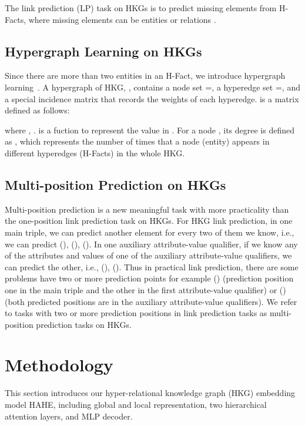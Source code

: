 \documentclass[11pt]{article}
\begin{document}
The link prediction (LP) task on HKGs is to predict missing elements from H-Facts, where missing elements can be entities   or relations . 


\subsection{Hypergraph Learning on HKGs} 
Since there are more than two entities in an H-Fact, we introduce hypergraph learning~\citep{HGNN}. A hypergraph of HKG, , contains a node set =, a hyperedge set =, and a special incidence matrix  that records the weights of each hyperedge.  is a  matrix defined as follows:

where , .  is a fuction to represent the value in . For a node , its degree is defined as , which represents the number of times that a node (entity) appears in different hyperedges (H-Facts) in the whole HKG.









\subsection{Multi-position Prediction on HKGs} 
Multi-position prediction is a new meaningful task with more practicality than the one-position link prediction task on HKGs. For HKG link prediction, in one main triple, we can predict another element for every two of them we know, i.e., we can predict (), (), (). In one auxiliary attribute-value qualifier, if we know any of the attributes and values of one of the auxiliary attribute-value qualifiers, we can predict the other, i.e., (), (). Thus in practical link prediction, there are some problems have two or more prediction points for example () (prediction position one in the main triple and the other in the first attribute-value qualifier) or () (both predicted positions are in the auxiliary attribute-value qualifiers). We refer to tasks with two or more prediction positions in link prediction tasks as multi-position prediction tasks on HKGs. 

\section{Methodology}
This section introduces our hyper-relational knowledge graph (HKG) embedding model HAHE, including global and local representation, two hierarchical attention layers, and MLP decoder.
\end{document}

